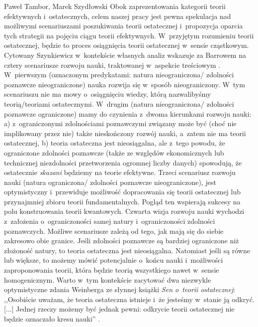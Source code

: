 \begin{artplenv}{Paweł Tambor, Marek Szydłowski}
Obok zaprezentowania kategorii teorii efektywnych i~ostatecznych, celem naszej pracy jest pewna spekulacja nad możliwymi scenariuszami poszukiwania teorii ostatecznej i~propozycja oparcia tych strategii na pojęciu ciągu teorii efektywnych. W~przyjętym rozumieniu teorii ostatecznej, będzie to proces osiągnięcia teorii ostatecznej w~sensie cząstkowym. Cytowany Szynkiewicz w~kontekście własnych analiz wskazuje za Barrowem na cztery scenariusze rozwoju nauki, traktowanej w~aspekcie treściowym
\parencite[][s.~118]{szynkiewicz_teorie_2009}. %
 W~pierwszym (oznaczonym predykatami: natura nieograniczona/ zdolności poznawcze nieograniczone) nauka rozwija się w~sposób nieograniczony. W~tym scenariuszu nie ma mowy o~osiągnięciu wiedzy, którą nazwalibyśmy teorią/teoriami ostatecznymi. W~drugim (natura nieograniczona/ zdolności poznawcze ograniczone) mamy do czynienia z~dwoma kierunkami rozwoju nauki: a) z~ograniczonymi zdolnościami poznawczymi związany może być (choć nie implikowany przez nie) także nieskończony rozwój nauki, a~zatem nie ma teorii ostatecznej, b) teoria ostateczna jest nieosiągalna, ale z~tego powodu, że ograniczone zdolności poznawcze (także ze względów ekonomicznych lub technicznej niezdolności przetworzenia ogromnej liczby danych) spowodują, że ostatecznie \textit{skazani} będziemy na teorie efektywne. Trzeci scenariusz rozwoju nauki (natura ograniczona/ zdolności poznawcze nieograniczone), jest optymistyczny i~przewiduje możliwość dopracowania się teorii ostatecznej lub przynajmniej zbioru teorii fundamentalnych. Pogląd ten wspierają sukcesy na polu konstruowania teorii kwantowych. Czwarta wizja rozwoju nauki wychodzi z~założenia o~ograniczoności samej natury i~ograniczoności zdolności poznawczych. Możliwe scenariusze zależą od tego, jak mają się do siebie zakresowo obie granice. Jeśli zdolności poznawcze są bardziej ograniczone niż złożoność natury, to teoria ostateczna jest nieosiągalna. Natomiast jeśli są równe lub większe, to możemy mówić potencjalnie o~końcu nauki i~możliwości zaproponowania teorii, która będzie teorią wszystkiego nawet w~sensie homogenicznym. Warto w~tym kontekście zacytować dwa niezwykle optymistyczne zdania Weinberga ze słynnej książki \textit{Sen o~teorii ostatecznej}: ,,Osobiście uważam, że teoria ostateczna istnieje i~że jesteśmy w~stanie ją odkryć. [...] Jednej rzeczy możemy być jednak pewni: odkrycie teorii ostatecznej nie będzie oznaczało kresu nauki'' 
\parencite[][s.~186.190]{weinberg_sen_1992}.%



\end{artplenv}
